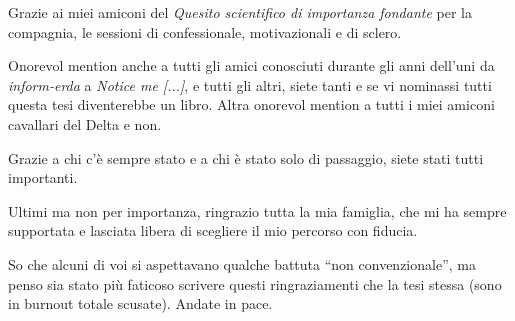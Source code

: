 \documentclass[12pt,a4paper,openright,twoside]{book}
\begin{document}
\begin{acknowledgements}
    Grazie ai miei amiconi del \emph{Quesito scientifico di importanza fondante} per la compagnia, le sessioni di
    confessionale, motivazionali e di sclero.

    Onorevol mention anche a tutti gli amici conosciuti durante gli anni dell'uni da \emph{inform-erda} a \emph{Notice me [...]},
    e tutti gli altri, siete tanti e se vi nominassi tutti questa tesi diventerebbe un libro.
    Altra onorevol mention a tutti i miei amiconi cavallari del Delta e non.

    Grazie a chi c'è sempre stato e a chi è stato solo di passaggio, siete stati tutti importanti.

    Ultimi ma non per importanza, ringrazio tutta la mia famiglia, che mi ha sempre supportata e lasciata libera di scegliere
    il mio percorso con fiducia.

    So che alcuni di voi si aspettavano qualche battuta ``non convenzionale'', ma penso sia stato più faticoso
    scrivere questi ringraziamenti che la tesi stessa (sono in burnout totale scusate).
    Andate in pace.
\end{acknowledgements}
\end{document}

